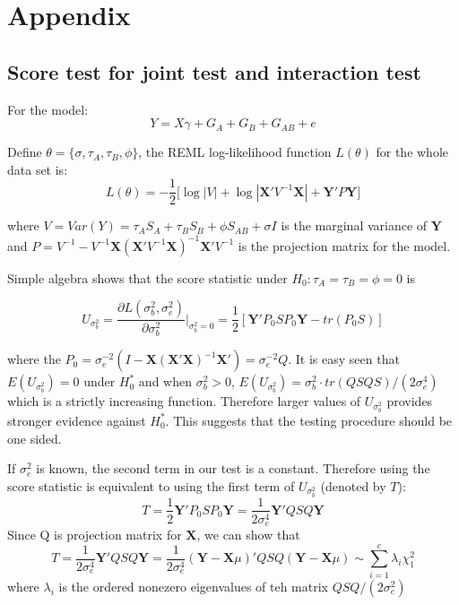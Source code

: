 \documentclass{article}
\newcommand{\Y}{\mathbf{Y}}
\newcommand{\X}{\mathbf{X}}
\begin{document}
    \section{Appendix}

        \subsection{Score test for joint test and interaction test}

            For the model:
            \begin{equation*}
                Y=X\gamma+G_A+G_B+G_{AB}+e
            \end{equation*}

            Define $\theta=\{\sigma,\tau_A,\tau_B,\phi\}$, the REML log-likelihood function $L(\theta)$ for the whole data set is:
            \[
                L(\theta)=-\frac{1}{2}\bigg[\log|V|+\log|\X'V^{-1}\X|+\Y'P\Y\bigg]
            \]

             where $V=Var(Y)=\tau_AS_A+\tau_BS_B+\phi S_{AB}+\sigma I$ is the marginal variance of $\Y$ and $P=V^{-1}-V^{-1}\X(\X'V^{-1}\X)^{-1}\X'V^{-1}$ is the projection matrix for the model.

            Simple algebra shows that the score statistic under $H_0:\tau_A=\tau_B=\phi=0$ is

            \[
                U_{\sigma^2_b}=\frac{\partial L(\sigma^2_b,\sigma^2_e)}{\partial \sigma^2_b}\bigg|_{\sigma^2_b=0}=\frac{1}{2}[\Y'P_0SP_0\Y-tr(P_0S)]
            \]

            where the $P_0=\sigma^{-2}_e(I-\X(\X'\X)^{-1}\X')=\sigma^{-2}_eQ$. It is easy seen that $E(U_{\sigma^2_b})=0$ under $H_0^*$ and when $\sigma^2_b>0$, $E(U_{\sigma^2_b})=\sigma^2_b\cdot tr(QSQS)/(2\sigma^4_e)$ which is a strictly increasing function. Therefore larger values of $U_{\sigma_b^2}$ provides stronger evidence against $H_0^*$. This suggests that the testing procedure should be one sided.

            If $\sigma_e^2$ is known, the second term in our test is a constant. Therefore using the score statistic is equivalent to using the first term of $U_{\sigma^2_b}$ (denoted by $T$):
            \[
                T=\frac{1}{2}\Y'P_0SP_0\Y=\frac{1}{2\sigma^4_e}\Y'QSQ\Y
            \]
            Since Q is projection matrix for $\X$, we can show that
            \[
                T=\frac{1}{2\sigma^4_e}\Y'QSQ\Y=\frac{1}{2\sigma^4_e}(\Y-\X\mu)'QSQ(\Y-\X\mu)\sim\sum_{i=1}^c\lambda_i\chi^2_1
            \]
            where $\lambda_i$ is the ordered nonezero eigenvalues of teh matrix $QSQ/(2\sigma^2_e)$
\end{document}
